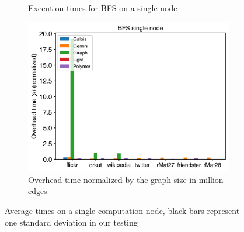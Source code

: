 \begin{figure}
\begin{subfigure}{0.3\textwidth}
		\caption{Execution times for BFS on a single node}
		\label{fig:singleNodeBFS_exec}
	\end{subfigure}
	\hfil
	\begin{subfigure}{0.3\textwidth}
		\includegraphics[width=\linewidth]{../../plots/singleNodeBFS_overheadTimeNormalized.png}
		\caption{Overhead time normalized by the graph size in million edges}
		\label{fig:singleNodeBFS_overheadNormalized}
	\end{subfigure}

	\caption{Average times on a single computation node, black bars represent one standard deviation in our testing}
\end{figure}



